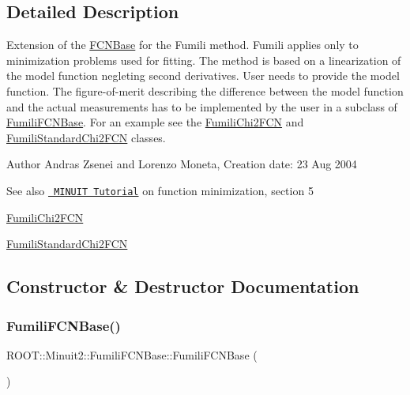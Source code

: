 \subsection{Detailed Description}
Extension of the \mbox{\hyperlink{classROOT_1_1Minuit2_1_1FCNBase}{F\+C\+N\+Base}} for the Fumili method. Fumili applies only to minimization problems used for fitting. The method is based on a linearization of the model function negleting second derivatives. User needs to provide the model function. The figure-\/of-\/merit describing the difference between the model function and the actual measurements has to be implemented by the user in a subclass of \mbox{\hyperlink{classROOT_1_1Minuit2_1_1FumiliFCNBase}{Fumili\+F\+C\+N\+Base}}. For an example see the \mbox{\hyperlink{classROOT_1_1Minuit2_1_1FumiliChi2FCN}{Fumili\+Chi2\+F\+CN}} and \mbox{\hyperlink{classROOT_1_1Minuit2_1_1FumiliStandardChi2FCN}{Fumili\+Standard\+Chi2\+F\+CN}} classes.

\begin{DoxyAuthor}{Author}
Andras Zsenei and Lorenzo Moneta, Creation date\+: 23 Aug 2004
\end{DoxyAuthor}
\begin{DoxySeeAlso}{See also}
\href{http://www.cern.ch/winkler/minuit/tutorial/mntutorial.pdf}{\texttt{ M\+I\+N\+U\+IT Tutorial}} on function minimization, section 5

\mbox{\hyperlink{classROOT_1_1Minuit2_1_1FumiliChi2FCN}{Fumili\+Chi2\+F\+CN}}

\mbox{\hyperlink{classROOT_1_1Minuit2_1_1FumiliStandardChi2FCN}{Fumili\+Standard\+Chi2\+F\+CN}} 
\end{DoxySeeAlso}


\subsection{Constructor \& Destructor Documentation}
\mbox{\label{classROOT_1_1Minuit2_1_1FumiliFCNBase_a118a4f34ec003713b719671842f5c6a2}} 
\subsubsection{\texorpdfstring{FumiliFCNBase()}{FumiliFCNBase()}\hspace{0.1cm}{\footnotesize\ttfamily [1/6]}}
{\footnotesize\ttfamily R\+O\+O\+T\+::\+Minuit2\+::\+Fumili\+F\+C\+N\+Base\+::\+Fumili\+F\+C\+N\+Base (\begin{DoxyParamCaption}{ }\end{DoxyParamCaption})\hspace{0.3cm}{\ttfamily [inline]}}

